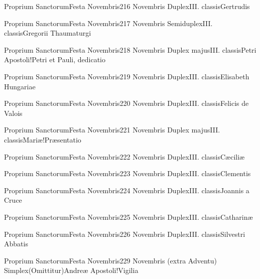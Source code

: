 \documentclass[invitatoriale-romanum.tex]{subfiles}
\begin{document}
	{Proprium Sanctorum}{Festa Novembris}{2}{16 Novembris}
	{Duplex}{III. classis}{Gertrudis}
	{}
	{}

	{Proprium Sanctorum}{Festa Novembris}{2}{17 Novembris}
	{Semiduplex}{III. classis}{Gregorii Thaumaturgi}
	{}
	{}

	{Proprium Sanctorum}{Festa Novembris}{2}{18 Novembris}
	{Duplex majus}{III. classis}{Petri Apostoli!Petri et Pauli, dedicatio}
	{}
	{}

	{Proprium Sanctorum}{Festa Novembris}{2}{19 Novembris}
	{Duplex}{III. classis}{Elisabeth Hungariae}
	{}
	{}

	{Proprium Sanctorum}{Festa Novembris}{2}{20 Novembris}
	{Duplex}{III. classis}{Felicis de Valois}
	{}
	{}

	{Proprium Sanctorum}{Festa Novembris}{2}{21 Novembris}
	{Duplex majus}{III. classis}{Mariæ!Præsentatio}
	{}
	{}

	{Proprium Sanctorum}{Festa Novembris}{2}{22 Novembris}
	{Duplex}{III. classis}{Cæciliæ}
	{}
	{}

	{Proprium Sanctorum}{Festa Novembris}{2}{23 Novembris}
	{Duplex}{III. classis}{Clementis}
	{}
	{}

	{Proprium Sanctorum}{Festa Novembris}{2}{24 Novembris}
	{Duplex}{III. classis}{Joannis a Cruce}
	{}
	{}

	{Proprium Sanctorum}{Festa Novembris}{2}{25 Novembris}
	{Duplex}{III. classis}{Catharinæ}
	{}
	{}

	{Proprium Sanctorum}{Festa Novembris}{2}{26 Novembris}
	{Duplex}{III. classis}{Silvestri Abbatis}
	{}
	{}

	{Proprium Sanctorum}{Festa Novembris}{2}{29 Novembris (extra Adventu)}
	{Simplex}{(Omittitur)}{Andreæ Apostoli!Vigilia}
	{}
	{}
\invitferia
\end{document}
